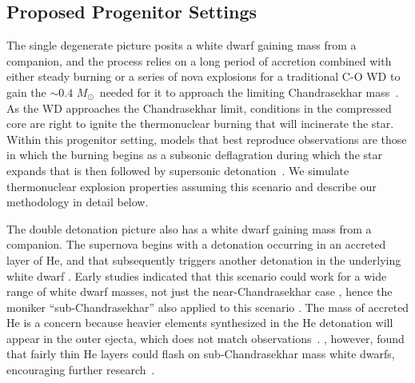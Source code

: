 \documentclass[preprint2]{aastex63}
\newcommand{\Msun}{\ensuremath{M_\odot}}
\begin{document}
{\color{blue}
\subsection{Proposed Progenitor Settings}\label{sec:progenitors}

The single degenerate picture posits a white dwarf gaining mass
from a companion, and the process relies on a long
period of accretion combined with either steady burning or a
series of nova explosions for a traditional
C-O WD to gain the $\sim 0.4$ \Msun\ needed for it to approach the
limiting Chandrasekhar mass~\citep{starrfieldetal2012}. As the WD approaches
the Chandrasekhar limit, conditions in the compressed core are right
to ignite the thermonuclear burning that will incinerate the star.
Within this progenitor setting, models that best reproduce observations 
are those in which the burning begins as a subsonic deflagration
during which the star expands that is then followed by supersonic 
detonation~\citep{Khokhlov1991Delayed-detonat,HoefKhok96,GameKhokOran05,
hillebrandtetal2013,calderetal2013}. We simulate thermonuclear explosion 
properties assuming this scenario and describe our methodology in
detail below.

The double detonation picture also has a white dwarf gaining mass from 
a companion. The supernova begins with 
a detonation occurring in an accreted layer of He, and that subsequently triggers 
another detonation in the underlying white dwarf \citep{woosleyweavertaam80,taam80a,taam80b,
nomoto80,nomoto82b}. Early studies indicated that this scenario could work 
for a wide range of white dwarf masses, not just the near-Chandrasekhar case 
\citep{livne90}, hence the moniker ``sub-Chandrasekhar'' also applied to this 
scenario \citep{ww94}. The mass of accreted He
is a concern because heavier
elements synthesized in the He detonation will appear in
the outer ejecta, which does not match observations~\citep{HoefKhok96,
hoeflichetal96,finkhillebrandtroepke2007,simetal2010}.  \citet{bildstenetal2007},
however, found that fairly thin He layers could flash on sub-Chandrasekhar
mass white dwarfs, encouraging
further research~\citep{simetal2012,brooksetal2015,shenetal2018,
glasneretal2018,Townsleyetal2019}.

}
\end{document}
